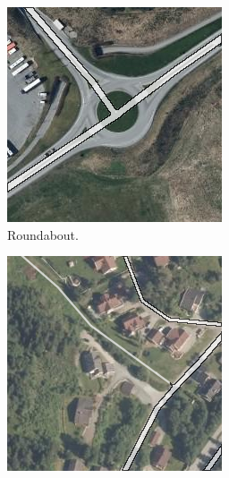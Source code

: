 \begin{figure}[h]
\begin{subfigure}{0.31\textwidth}
\includegraphics[width=\linewidth]{figs/datasets/nor_examples/1177_roundabout_n50.png}
\caption{Roundabout.} \label{fig:norwegian_roads_roundabout_n50}
\end{subfigure}
\hspace*{\fill} %
\begin{subfigure}{0.31\textwidth}
\includegraphics[width=\linewidth]{figs/datasets/nor_examples/1157_missing_n50.png}

\end{subfigure}
\end{figure}
